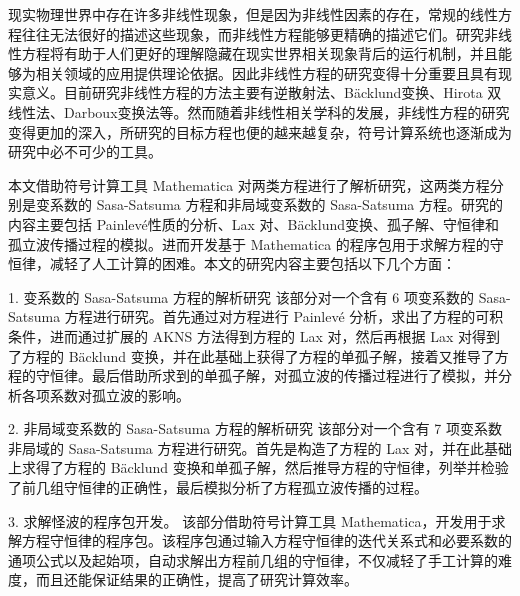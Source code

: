 


\begin{cabstract}
现实物理世界中存在许多非线性现象，但是因为非线性因素的存在，常规的线性方程往往无法很好的描述这些现象，而非线性方程能够更精确的描述它们。研究非线性方程将有助于人们更好的理解隐藏在现实世界相关现象背后的运行机制，并且能够为相关领域的应用提供理论依据。因此非线性方程的研究变得十分重要且具有现实意义。目前研究非线性方程的方法主要有逆散射法、B\"{a}cklund变换、Hirota 双线性法、Darboux变换法等。然而随着非线性相关学科的发展，非线性方程的研究变得更加的深入，所研究的目标方程也便的越来越复杂，符号计算系统也逐渐成为研究中必不可少的工具。

本文借助符号计算工具 Mathematica 对两类方程进行了解析研究，这两类方程分别是变系数的 Sasa-Satsuma 方程和非局域变系数的 Sasa-Satsuma 方程。研究的内容主要包括 Painlev\'{e}性质的分析、Lax 对、B\"{a}cklund变换、孤子解、守恒律和孤立波传播过程的模拟。进而开发基于 Mathematica 的程序包用于求解方程的守恒律，减轻了人工计算的困难。本文的研究内容主要包括以下几个方面：

1. 变系数的 Sasa-Satsuma 方程的解析研究
该部分对一个含有 6 项变系数的 Sasa-Satsuma 方程进行研究。首先通过对方程进行 Painlev\'{e} 分析，求出了方程的可积条件，进而通过扩展的 AKNS 方法得到方程的 Lax 对，然后再根据 Lax 对得到了方程的 B\"{a}cklund 变换，并在此基础上获得了方程的单孤子解，接着又推导了方程的守恒律。最后借助所求到的单孤子解，对孤立波的传播过程进行了模拟，并分析各项系数对孤立波的影响。

2. 非局域变系数的 Sasa-Satsuma 方程的解析研究
该部分对一个含有 7 项变系数非局域的 Sasa-Satsuma 方程进行研究。首先是构造了方程的 Lax 对，并在此基础上求得了方程的 B\"{a}cklund 变换和单孤子解，然后推导方程的守恒律，列举并检验了前几组守恒律的正确性，最后模拟分析了方程孤立波传播的过程。

3. 求解怪波的程序包开发。
该部分借助符号计算工具 Mathematica，开发用于求解方程守恒律的程序包。该程序包通过输入方程守恒律的迭代关系式和必要系数的通项公式以及起始项，自动求解出方程前几组的守恒律，不仅减轻了手工计算的难度，而且还能保证结果的正确性，提高了研究计算效率。

\end{cabstract}


